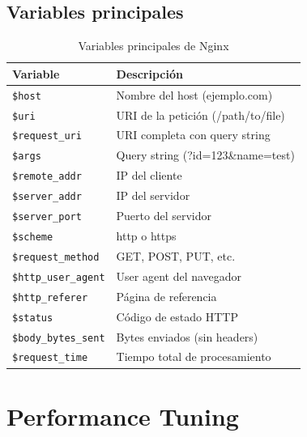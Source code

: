 \documentclass[11pt,a4paper]{article}
\begin{document}
\subsection{Variables principales}

\begin{table}[h]
\centering
\begin{tabular}{|l|p{8cm}|}
\hline
\textbf{Variable} & \textbf{Descripción} \\
\hline
\texttt{\$host} & Nombre del host (ejemplo.com) \\
\texttt{\$uri} & URI de la petición (/path/to/file) \\
\texttt{\$request\_uri} & URI completa con query string \\
\texttt{\$args} & Query string (?id=123\&name=test) \\
\texttt{\$remote\_addr} & IP del cliente \\
\texttt{\$server\_addr} & IP del servidor \\
\texttt{\$server\_port} & Puerto del servidor \\
\texttt{\$scheme} & http o https \\
\texttt{\$request\_method} & GET, POST, PUT, etc. \\
\texttt{\$http\_user\_agent} & User agent del navegador \\
\texttt{\$http\_referer} & Página de referencia \\
\texttt{\$status} & Código de estado HTTP \\
\texttt{\$body\_bytes\_sent} & Bytes enviados (sin headers) \\
\texttt{\$request\_time} & Tiempo total de procesamiento \\
\hline
\end{tabular}
\caption{Variables principales de Nginx}
\end{table}

\section{Performance Tuning}
\end{document}
